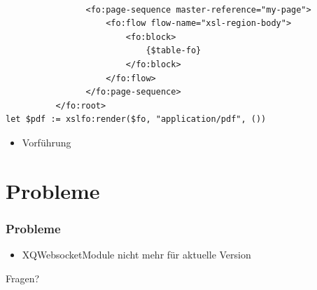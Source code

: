 \documentclass{beamer}
\begin{document}
\begin{frame}[fragile]
\begin{lstlisting}                
                
                <fo:page-sequence master-reference="my-page">
                    <fo:flow flow-name="xsl-region-body">
                        <fo:block>
                            {$table-fo}
                        </fo:block>
                    </fo:flow>
                </fo:page-sequence>
          </fo:root>
let $pdf := xslfo:render($fo, "application/pdf", ())
\end{lstlisting}
\end{frame}

\begin{frame}
\begin{itemize}
\item Vorführung
\end{itemize}
\end{frame}

\section{Probleme}
\begin{frame}
\frametitle{Probleme}
\begin{itemize}
	\item XQWebsocketModule nicht mehr für aktuelle Version
\end{itemize}
\end{frame}

\begin{frame}

\begin{center}
\Huge Fragen?
\end{center}

\end{frame}
\end{document}
